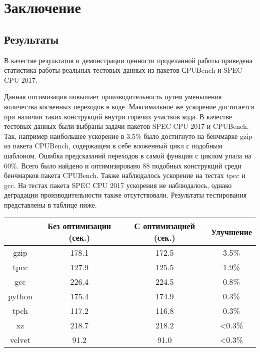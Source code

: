 \section{Заключение}
\label{sec:Chapter5} 


\subsection{Результаты}

В качестве результатов и демонстрации ценности проделанной работы приведена статистика работы реальных тестовых данных из пакетов СPUBench и SPEC CPU 2017. 

Данная оптимизация повышает производительность путем уменьшения количества косвенных переходов в коде. Максимальное же ускорение достигается при наличии таких конструкций внутри горячих участков кода. В качестве тестовых данных были выбраны задачи пакетов SPEC CPU 2017 и CPUBench. Так, например наибольшее ускорение в 3.5\% было достигнуто на бенчмарке gzip из пакета CPUBench, содержащем в себе вложенный цикл с подобным шаблоном. Ошибка предсказаний переходов в самой функции с циклом упала на 60\%. Всего было найдено и оптимизировано 88 подобных конструкций среди бенчмарков пакета CPUBench. Также наблюдалось ускорение на тестах tpcc и gcc. На тестах пакета SPEC CPU 2017 ускорения не наблюдалось, однако деградации производительности также отсутствовали. Результаты тестирования представлены в таблице ниже.

\begin{table}[!htb]
    \centering
    \begin{tabular}{|c|c|c|c|}
        \hline
           & Без оптимизации (сек.)  & С оптимизацией (сек.)  & Улучшение  \\ \hline
        gzip    & 178.1  & 172.5  & 3.5\%  \\ \hline
        tpcc    & 127.9 & 125.5 & 1.9\% \\ \hline
        gcc     & 226.4 & 224.5 & 0.8\% \\ \hline
        python  & 175.4 & 174.9 & 0.3\% \\ \hline
        tpch    & 117.2 & 116.8 & 0.3\% \\ \hline
        xz      & 218.7 & 218.2 & <0.3\% \\ \hline
        velvet  & 91.2 & 91.0 & <0.3\% \\ \hline
    \end{tabular}
\end{table}

